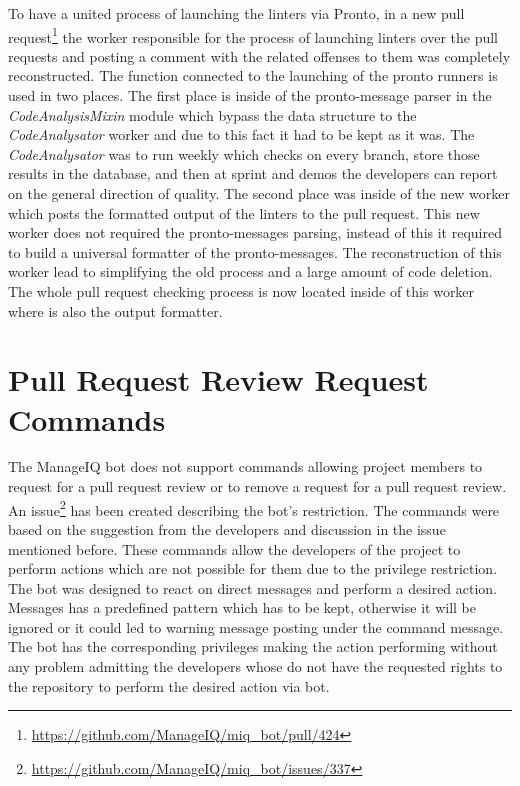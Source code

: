 To have a united process of launching the linters via Pronto, in a new pull request\footnote{\url{https://github.com/ManageIQ/miq_bot/pull/424}} the worker responsible for the process of launching linters over the pull requests and posting a comment with the related offenses to them was completely reconstructed. The function connected to the launching of the pronto runners is used in two places. The first place is inside of the pronto-message parser in the \textit{CodeAnalysisMixin} module which bypass the data structure to the \textit{CodeAnalysator} worker and due to this fact it had to be kept as it was. The \textit{CodeAnalysator} was to run weekly which checks on every branch, store those results in the database, and then at sprint and demos the developers can report on the general direction of quality. The second place was inside of the new worker which posts the formatted output of the linters to the pull request. This new worker does not required the pronto-messages parsing, instead of this it required to build a universal formatter of the pronto-messages.  The reconstruction of this worker lead to simplifying the old process and a large amount of code deletion. The whole pull request checking process is now located inside of this worker where is also the output formatter.

\section{Pull Request Review Request Commands}

The ManageIQ bot does not support commands allowing project members to request for a pull request review or to remove a request for a pull request review. An issue\footnote{\url{https://github.com/ManageIQ/miq_bot/issues/337}} has been created describing the bot's restriction. The commands were based on the suggestion from the developers and discussion in the issue mentioned before. These commands allow the developers of the project to perform actions which are not possible for them due to the privilege restriction. The bot was designed to react on direct messages and perform a desired action. Messages has a predefined pattern which has to be kept, otherwise it will be ignored or it could led to warning message posting under the command message. The bot has the corresponding privileges making the action performing without any problem admitting the developers whose do not have the requested rights to the repository to perform the desired action via bot.

